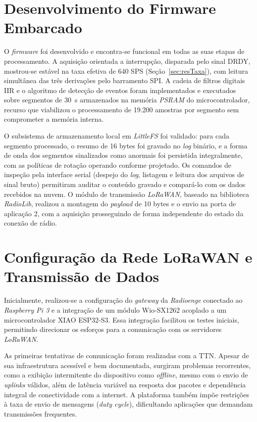 \section{Desenvolvimento do Firmware Embarcado}
\label{sec:resFirmware}

O \textit{firmware} foi desenvolvido e encontra-se funcional em todas as suas etapas de processamento. A aquisição orientada a interrupção, disparada pelo sinal \acs{DRDY}, mostrou-se estável na taxa efetiva de 640 SPS (Seção~\ref{sec:resTaxa}), com leitura simultânea das três derivações pelo barramento \acs{SPI}. A cadeia de filtros digitais \acs{IIR} e o algoritmo de detecção de eventos foram implementados e executados sobre segmentos de 30~s armazenados na memória \textit{PSRAM} do microcontrolador, recurso que viabilizou o processamento de 19.200 amostras por segmento sem comprometer a memória interna.

O subsistema de armazenamento local em \textit{LittleFS} foi validado: para cada segmento processado, o resumo de 16 bytes foi gravado no \textit{log} binário, e a forma de onda dos segmentos sinalizados como anormais foi persistida integralmente, com as políticas de rotação operando conforme projetado. Os comandos de inspeção pela interface serial (despejo do \textit{log}, listagem e leitura dos arquivos de sinal bruto) permitiram auditar o conteúdo gravado e compará-lo com os dados recebidos na nuvem. O módulo de transmissão \textit{LoRaWAN}, baseado na biblioteca \textit{RadioLib}, realizou a montagem do \textit{payload} de 10 bytes e o envio na porta de aplicação 2, com a aquisição prosseguindo de forma independente do estado da conexão de rádio.

\section{Configuração da Rede LoRaWAN e Transmissão de Dados}
\label{sec:resTransmissao}

Inicialmente, realizou-se a configuração do \textit{gateway} da \textit{Radioenge} conectado ao \textit{Raspberry Pi 3} e a integração de um módulo Wio-SX1262 acoplado a um microcontrolador XIAO ESP32-S3. Essa integração facilitou os testes iniciais, permitindo direcionar os esforços para a comunicação com os servidores \textit{LoRaWAN}.

As primeiras tentativas de comunicação foram realizadas com a \acs{TTN}. Apesar de sua infraestrutura acessível e bem documentada, surgiram problemas recorrentes, como a exibição intermitente do dispositivo como \textit{offline}, mesmo com o envio de \textit{uplinks} válidos, além de latência variável na resposta dos pacotes e dependência integral de conectividade com a internet. A plataforma também impõe restrições à taxa de envio de mensagens (\textit{duty cycle}), dificultando aplicações que demandam transmissões frequentes.

